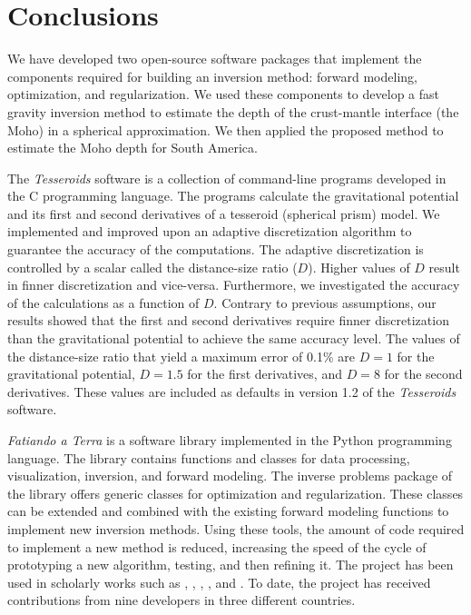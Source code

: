 \chapter{Conclusions}


We have developed two open-source software packages that implement the
components required for building an inversion method: forward modeling,
optimization, and regularization.
We used these components to develop a fast gravity inversion method to estimate
the depth of the crust-mantle interface (the Moho) in a spherical
approximation.
We then applied the proposed method to estimate the Moho depth for South
America.

The \textit{Tesseroids} software is a collection of command-line
programs developed in the C programming language.
The programs calculate the gravitational potential and its first and second
derivatives of a tesseroid (spherical prism) model.
We implemented and improved upon an adaptive discretization algorithm to
guarantee the accuracy of the computations.
The adaptive discretization is controlled by a scalar called the distance-size
ratio ($D$).
Higher values of $D$ result in finner discretization and vice-versa.
Furthermore, we investigated the accuracy of the calculations as a function of
$D$.
Contrary to previous assumptions, our results showed that the first and second
derivatives require finner discretization than the gravitational potential to
achieve the same accuracy level.
The values of the distance-size ratio that yield a maximum error of 0.1\%
are $D = 1$ for the gravitational potential, $D = 1.5$ for the first
derivatives, and $D = 8$ for the second derivatives.
These values are included as defaults in version 1.2 of the \textit{Tesseroids}
software.

\textit{Fatiando a Terra} is a software library implemented in the Python
programming language.
The library contains functions and classes for data processing, visualization,
inversion, and forward modeling.
The inverse problems package of the library offers generic classes for
optimization and regularization.
These classes can be extended and combined with the existing forward modeling
functions to implement new inversion methods.
Using these tools, the amount of code required to implement a new method is
reduced, increasing the speed of the cycle of prototyping a new algorithm,
testing, and then refining it.
The project has been used in scholarly works such as
\citet{carlos2014}, \citet{hidalgo-gato2015a}, \citet{niccoli2015},
\citet{oliveirajr.2015}, and \citet{bassett2016}.
To date, the project has received contributions from nine developers in three
different countries.

